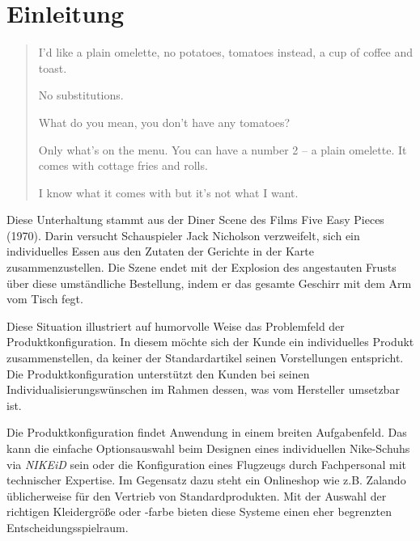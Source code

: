 \documentclass[11pt, a4paper, titlepage, listof=totoc, bibliography=totoc, index=totoc, twoside, openright, headings=normal]{scrreprt}
\begin{document}






%





\chapter{Einleitung}
\begin{quote}
\glqq I'd like a plain omelette, no potatoes, tomatoes instead, a cup of coffee and toast.\grqq{}
\begin{addmargin}[25pt]{0pt} 
\glqq No substitutions.\grqq{}
\end{addmargin}
\glqq What do you mean, you don't have any tomatoes?\grqq{}
\begin{addmargin}[25pt]{0pt} 
\glqq Only what's on the menu. You can have a number 2 -- a plain omelette. It comes with cottage fries and rolls.\grqq{}
\end{addmargin}
\glqq I know what it comes with but it's not what I want.\grqq{}
\end{quote}
Diese Unterhaltung stammt aus der \glqq Diner Scene\grqq{} des Films \glqq Five Easy Pieces\grqq{} (1970). Darin versucht Schauspieler Jack Nicholson verzweifelt, sich ein individuelles Essen aus den Zutaten der Gerichte in der Karte zusammenzustellen. Die Szene endet mit der Explosion des angestauten Frusts über diese umständliche Bestellung, indem er das gesamte Geschirr mit dem Arm vom Tisch fegt.

Diese Situation illustriert auf humorvolle Weise das Problemfeld der Produktkonfiguration. In diesem möchte sich der Kunde ein individuelles Produkt zusammenstellen, da keiner der Standardartikel seinen Vorstellungen entspricht. Die Produktkonfiguration unterstützt den Kunden bei seinen Individualisierungswünschen im Rahmen dessen, was vom Hersteller umsetzbar ist.

Die Produktkonfiguration findet Anwendung in einem breiten Aufgabenfeld. Das kann die einfache Optionsauswahl beim Designen eines individuellen Nike-Schuhs via \emph{NIKEiD} sein oder die Konfiguration eines Flugzeugs durch Fachpersonal mit technischer Expertise. Im Gegensatz dazu steht ein Onlineshop wie z.B. Zalando üblicherweise für den Vertrieb von Standardprodukten. Mit der Auswahl der richtigen Kleidergröße oder -farbe bieten diese Systeme einen eher begrenzten Entscheidungsspielraum.
\end{document}
